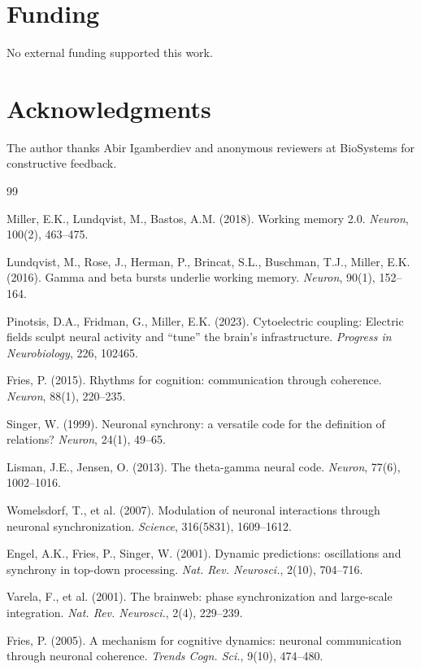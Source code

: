 \documentclass[12pt]{article}
\begin{document}
\section*{Funding}

No external funding supported this work.

\section*{Acknowledgments}

The author thanks Abir Igamberdiev and anonymous reviewers at BioSystems for constructive feedback.

\begin{thebibliography}{99}

Miller, E.K., Lundqvist, M., Bastos, A.M. (2018). Working memory 2.0. \textit{Neuron}, 100(2), 463--475.

Lundqvist, M., Rose, J., Herman, P., Brincat, S.L., Buschman, T.J., Miller, E.K. (2016). Gamma and beta bursts underlie working memory. \textit{Neuron}, 90(1), 152--164.

Pinotsis, D.A., Fridman, G., Miller, E.K. (2023). Cytoelectric coupling: Electric fields sculpt neural activity and ``tune'' the brain's infrastructure. \textit{Progress in Neurobiology}, 226, 102465.

Fries, P. (2015). Rhythms for cognition: communication through coherence. \textit{Neuron}, 88(1), 220--235.

Singer, W. (1999). Neuronal synchrony: a versatile code for the definition of relations? \textit{Neuron}, 24(1), 49--65.

Lisman, J.E., Jensen, O. (2013). The theta-gamma neural code. \textit{Neuron}, 77(6), 1002--1016.

Womelsdorf, T., et al. (2007). Modulation of neuronal interactions through neuronal synchronization. \textit{Science}, 316(5831), 1609--1612.

Engel, A.K., Fries, P., Singer, W. (2001). Dynamic predictions: oscillations and synchrony in top-down processing. \textit{Nat. Rev. Neurosci.}, 2(10), 704--716.

Varela, F., et al. (2001). The brainweb: phase synchronization and large-scale integration. \textit{Nat. Rev. Neurosci.}, 2(4), 229--239.

Fries, P. (2005). A mechanism for cognitive dynamics: neuronal communication through neuronal coherence. \textit{Trends Cogn. Sci.}, 9(10), 474--480.


\end{thebibliography}
\end{document}
